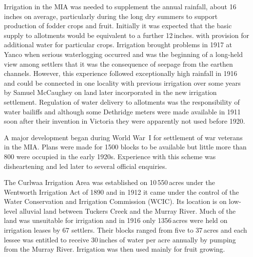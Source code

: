 Irrigation in the MIA was needed to supplement the annual rainfall,
about 16\,inches on average, particularly during the long dry summers
to support production of fodder crops and
fruit.  Initially it was expected that the basic supply
to allotments would be equivalent to a further 12\,inches. with
provision for additional water for particular crops. Irrigation
brought problems in 1917 at Yanco when serious waterlogging
 occurred and was the beginning of a
long-held view among settlers that it was the consequence of
seepage from the earthen
channels.  However, this experience followed
exceptionally high rainfall in 1916 and could be connected in one
locality with previous irrigation over some years by Samuel McCaughey
on land later incorporated in the new irrigation settlement.
Regulation of water delivery to allotments was the responsibility of
water bailiffs and although some Dethridge meters
 were made available in 1911 soon
after their invention in Victoria they were apparently not used before
1920.

A major development began during World War~I for settlement of war
veterans in the MIA.  Plans were made for 1500 blocks to be available
but little more than 800 were occupied in the early 1920s.  Experience
with this scheme was disheartening and led later to several official
enquiries.

The Curlwaa Irrigation Area  was
established on 10\,550\,acres under the Wentworth Irrigation Act
 of 1890 and in 1912
it came under the control of the Water Conservation and Irrigation
Commission (WCIC).  Its location is on low-level alluvial land between
Tuckers Creek  and the Murray River. Much of the
land was unsuitable for irrigation and in 1916 only 1356\,acres were
held on irrigation leases by 67 settlers.  Their blocks ranged from
five to 37\,acres and each lessee was entitled to receive
30\,inches of water per acre annually by
pumping from the
Murray River.  Irrigation was then used mainly for
fruit growing.

